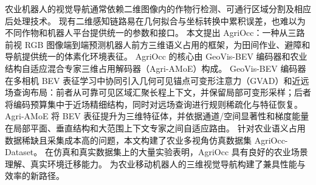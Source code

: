 农业机器人的视觉导航通常依赖二维图像内的作物行检测、可通行区域分割及相应后处理技术。
现有二维感知链路易在几何拟合与坐标转换中累积误差，也难以为不同作物和机器人平台提供统一的参数和接口。
本文提出 AgriOcc：一种从三路前视 RGB 图像端到端预测机器人前方三维语义占用的框架，为田间作业、避障和导航提供统一的体素化环境表征。
AgriOcc 的核心由 GeoVis-BEV 编码器和农业结构自适应混合专家三维占用解码器（Agri-AMoE）构成。
GeoVis-BEV 编码器在多相机 BEV 表征学习中协同引入几何可见锚点可变形注意力（GVAD）和近远场查询布局：前者从可靠可见区域汇聚长程上下文，并保留局部可变形采样；后者将编码预算集中于近场精细结构，同时对远场查询进行规则稀疏化与特征恢复。
Agri-AMoE 将 BEV 表征提升为三维特征体，并依据通道/空间显著性和梯度能量在局部平面、垂直结构和大范围上下文专家之间自适应路由。
针对农业语义占用数据稀缺且采集成本高的问题，本文构建了农业多视角仿真数据集 AgriOcc-Dataset。
在仿真和真实数据集上的大量实验表明，AgriOcc 具有良好的农业场景理解、真实环境迁移能力。
为农业移动机器人的三维视觉导航构建了兼具性能与效率的新路径。
